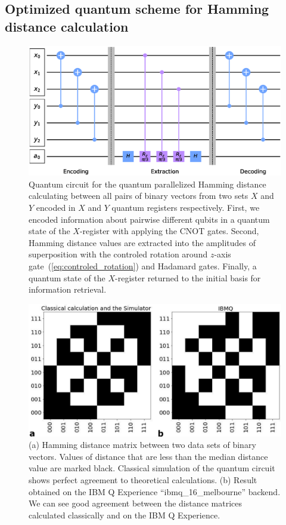 \documentclass[pra,showkeys,twocolumn,showpacs]{revtex4-1}
\begin{document}
\subsection{Optimized quantum scheme for Hamming distance calculation}
\label{subsec:qcircuit}


\begin{figure}[t]
	\includegraphics[width=\columnwidth]{qcircuit.eps}
	\caption{
		Quantum circuit for the quantum parallelized Hamming distance calculating  between all pairs of binary vectors from two sets ${X}$ and ${Y}$ encoded \cite{trugenberger2001} in $X$ and $Y$ quantum registers   respectively.
		First, we encoded information about pairwise different qubits in a quantum state of the $X$-register with applying the CNOT gates. 
		Second, Hamming distance values are extracted into the amplitudes of superposition with the controled rotation around $z$-axis gate~(\ref{eq:controled_rotation}) and Hadamard gates. 
		Finally, a quantum state of the $X$-register returned to the initial basis for information retrieval. 	
	} 
	\label{fig:qcircuit}
\end{figure}



\begin{figure}[t]
	\includegraphics[width=0.95\columnwidth]{distance_matrix.png}
	\caption{
		(a) Hamming distance matrix between two data sets of binary vectors. 
		Values of distance that are less than the median distance value are marked black. 
		Classical simulation of the quantum circuit shows perfect agreement to theoretical calculations. 
		(b) Result obtained on the IBM Q Experience ``ibmq\_16\_melbourne'' backend. 
		We can see good agreement between the distance matrices calculated classically and on the IBM Q Experience.  
	}
	\label{fig:distance_matrix}
\end{figure}
\end{document}
